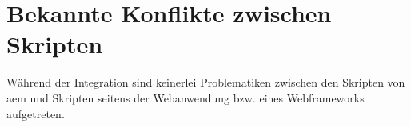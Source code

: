 \section{Bekannte Konflikte zwischen Skripten}
Während der Integration sind keinerlei Problematiken zwischen den Skripten von \ac{aem} und Skripten seitens der Webanwendung bzw. eines Webframeworks aufgetreten.
\missingall